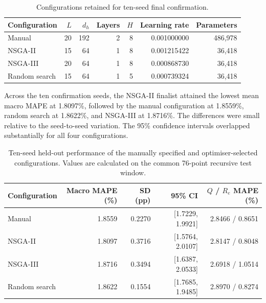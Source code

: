 \documentclass[a4paper,fleqn]{cas-sc}
\begin{document}
\begin{table}[htbp]
\centering
\caption{Configurations retained for ten-seed final confirmation.}
\label{tab:final_configs}
\begin{tabular}{lrrrrrr}
\toprule
\textbf{Configuration} &
\textbf{$L$} &
\textbf{$d_h$} &
\textbf{Layers} &
\textbf{$H$} &
\textbf{Learning rate} &
\textbf{Parameters} \\
\midrule
Manual &
20 & 192 & 2 & 8 &
0.001000000 &
486,978 \\

NSGA-II &
15 & 64 & 1 & 8 &
0.001215422 &
36,418 \\

NSGA-III &
20 & 64 & 1 & 8 &
0.000868730 &
36,418 \\

Random search &
15 & 64 & 1 & 5 &
0.000739324 &
36,418 \\
\bottomrule
\end{tabular}
\end{table}

Across the ten confirmation seeds, the NSGA-II finalist attained the lowest mean macro MAPE at 1.8097\%, followed by the manual configuration at 1.8559\%, random search at 1.8622\%, and NSGA-III at 1.8716\%. The differences were small relative to the seed-to-seed variation. The 95\% confidence intervals overlapped substantially for all four configurations.

\begin{table}[htbp]
\centering
\caption{Ten-seed held-out performance of the manually specified and optimiser-selected configurations. Values are calculated on the common 76-point recursive test window.}
\label{tab:final_accuracy}
\begin{tabular}{lrrrr}
\toprule
\textbf{Configuration} &
\textbf{Macro MAPE (\%)} &
\textbf{SD (pp)} &
\textbf{95\% CI} &
\textbf{$Q$ / $R_e$ MAPE (\%)} \\
\midrule
Manual &
1.8559 &
0.2270 &
[1.7229, 1.9921] &
2.8466 / 0.8651 \\

NSGA-II &
1.8097 &
0.3716 &
[1.5764, 2.0107] &
2.8147 / 0.8048 \\

NSGA-III &
1.8716 &
0.3494 &
[1.6387, 2.0533] &
2.6918 / 1.0514 \\

Random search &
1.8622 &
0.1554 &
[1.7685, 1.9485] &
2.8970 / 0.8274 \\
\bottomrule
\end{tabular}
\end{table}
\end{document}
